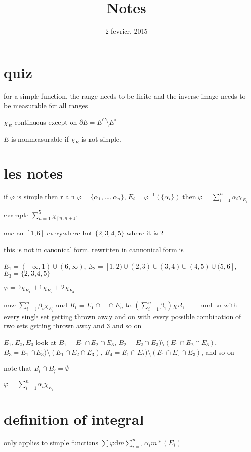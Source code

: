 \documentclass[letterpaper]{article}
\begin{document}
\title{Notes}
\date{2 fevrier, 2015}
\maketitle
\section*{quiz}
for a simple function, the range needs to be finite and the inverse image needs to be measurable for all ranges

$\chi_E$ continuous except on $\partial E=E^C\setminus E^\circ$

$E$ is nonmeasurable if $\chi_E$ is not simple.


\section*{les notes}
if $\varphi$ is simple then r a n $\varphi=\{\alpha_1,\dots,\alpha_n\}$, $E_i=\varphi^{-1}(\{\alpha_i\})$ then $\varphi=\sum\limits_{i=1}^n{\alpha_i\chi_{E_i}}$

example
$\sum\limits_{n=1}^5{\chi_{[n,n+1]}}$

one on $[1,6]$ everywhere but $\{2,3,4,5\}$ where it is 2.

this is not in canonical form. rewritten in cannonical form is

$E_1=(-\infty,1)\cup(6,\infty)$, $E_2=[1,2)\cup(2,3)\cup(3,4)\cup(4,5)\cup(5,6]$, $E_3=\{2,3,4,5\}$

$\varphi=0\chi_{E_1}+1\chi_{E_2}+2\chi_{E_3}$

now $\sum\limits_{i=1}^n{\beta_i\chi_{E_i}}$ and $B_1=E_1\cap\dots\cap E_n$ to $(\sum\limits_{i=1}^n{\beta_1})\chi B_1+\dots$ and on with every single set getting thrown away and on with every possible combination of two sets getting thrown away and 3 and so on

$E_1,E_2,E_3$ look at $B_1=E_1\cap E_2\cap E_3$, $B_2=E_2\cap E_3)\setminus (E_1\cap E_2\cap E_3)$, $B_3=E_1\cap E_3)\setminus (E_1\cap E_2\cap E_3)$, $B_4=E_1\cap E_2)\setminus (E_1\cap E_2\cap E_3)$, and so on

note that $B_i\cap B_j=\emptyset$

$\varphi=\sum\limits_{i=1}^n{\alpha_i\chi_{E_i}}$

\section*{definition of integral}
only applies to simple functions
$\sum\limits{\varphi\mathrm{d}m}\sum\limits_{i=1}^n{\alpha_i m*(E_i)}$
\end{document}
